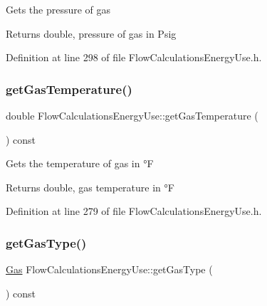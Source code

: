Gets the pressure of gas

\begin{DoxyReturn}{Returns}
double, pressure of gas in Psig 
\end{DoxyReturn}


Definition at line 298 of file Flow\+Calculations\+Energy\+Use.\+h.

\mbox{\label{class_flow_calculations_energy_use_a9d5782d594530c0345ac3c8faff252b3}} 
\subsubsection{\texorpdfstring{get\+Gas\+Temperature()}{getGasTemperature()}}
{\footnotesize\ttfamily double Flow\+Calculations\+Energy\+Use\+::get\+Gas\+Temperature (\begin{DoxyParamCaption}{ }\end{DoxyParamCaption}) const\hspace{0.3cm}{\ttfamily [inline]}}

Gets the temperature of gas in °F

\begin{DoxyReturn}{Returns}
double, gas temperature in °F 
\end{DoxyReturn}


Definition at line 279 of file Flow\+Calculations\+Energy\+Use.\+h.

\mbox{\label{class_flow_calculations_energy_use_a04df0a0c655c4aef3d5a4539d57fec2e}} 
\subsubsection{\texorpdfstring{get\+Gas\+Type()}{getGasType()}}
{\footnotesize\ttfamily \hyperlink{class_flow_calculations_energy_use_a840d5a836e7b05d6791b79bace4440f2}{Gas} Flow\+Calculations\+Energy\+Use\+::get\+Gas\+Type (\begin{DoxyParamCaption}{ }\end{DoxyParamCaption}) const\hspace{0.3cm}{\ttfamily [inline]}}

